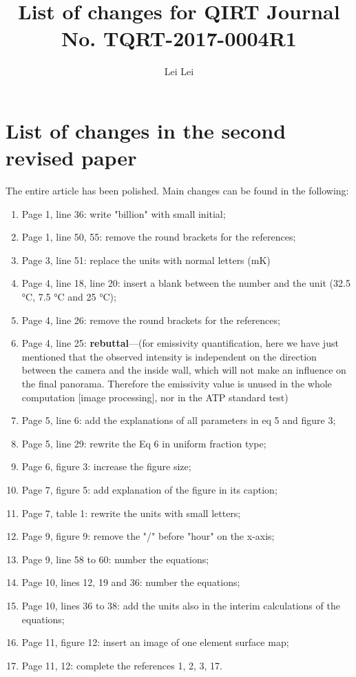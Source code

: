 \documentclass{article}
\begin{document}
    
\title{List of changes for QIRT Journal No. TQRT-2017-0004R1}
\author{Lei Lei}

\maketitle

\section{List of changes in the second revised paper} %
The entire article has been polished. Main changes can be found in the following:
\begin{enumerate}
    \item Page 1, line 36: write "billion" with small initial; 
    \item Page 1, line 50, 55: remove the round brackets for the references;
    \item Page 3, line 51: replace the units with normal letters (mK)
    \item Page 4, line 18, line 20: insert a blank between the number and the unit (32.5 °C, 7.5 °C and 25 °C);
    \item Page 4, line 26: remove the round brackets for the references;
    \item Page 4, line 25: \textbf{rebuttal}---(for emissivity quantification, here we have just mentioned that the observed intensity is independent on the direction between the camera and the inside wall, which will not make an influence on the final panorama. Therefore the emissivity value is unused in the whole computation [image processing], nor in the ATP standard test)
    \item Page 5, line 6: add the explanations of all parameters in eq 5 and figure 3;
    \item Page 5, line 29: rewrite the Eq 6 in uniform fraction type;
    \item Page 6, figure 3: increase the figure size;
    \item Page 7, figure 5: add explanation of the figure in its caption;
    \item Page 7, table 1: rewrite the units with small letters;
    \item Page 9, figure 9: remove the "/" before "hour" on the x-axis;
    \item Page 9, line 58 to 60: number the equations;
    \item Page 10, lines 12, 19 and 36: number the equations;
    \item Page 10, lines 36 to 38: add the units also in the interim calculations of the equations;
    \item Page 11, figure 12: insert an image of one element surface map;
    \item Page 11, 12: complete the references 1, 2, 3, 17.
\end{enumerate}
\end{document}
